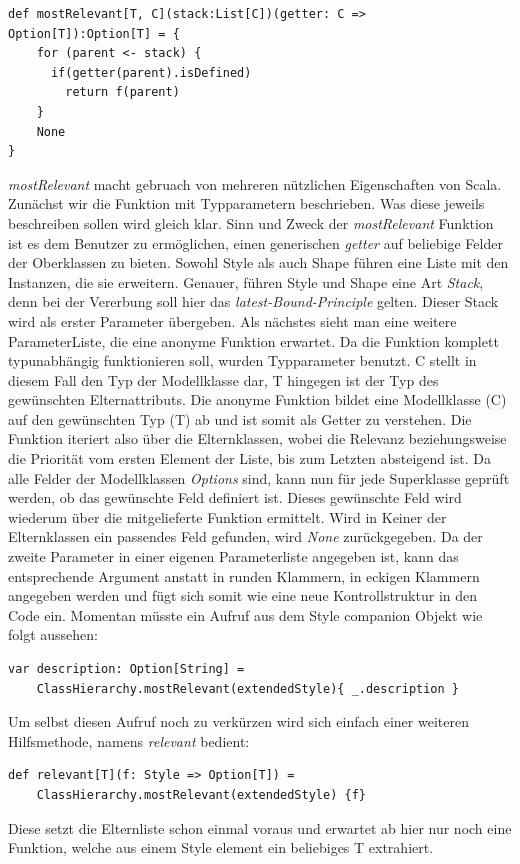 \begin{lstlisting}[style=scala]
def mostRelevant[T, C](stack:List[C])(getter: C => Option[T]):Option[T] = {
    for (parent <- stack) {
      if(getter(parent).isDefined)
        return f(parent)
    }
    None
}
\end{lstlisting}\textit{mostRelevant} macht gebruach von mehreren nützlichen Eigenschaften von Scala. Zunächst wir die Funktion mit Typparametern beschrieben. Was diese jeweils beschreiben sollen wird gleich klar. Sinn und Zweck der \textit{mostRelevant} Funktion ist es dem Benutzer zu ermöglichen, einen generischen \textit{getter} auf beliebige Felder der Oberklassen zu bieten. Sowohl Style als auch Shape führen eine Liste mit den Instanzen, die sie erweitern.
Genauer, führen Style und Shape eine Art \textit{Stack}, denn bei der Vererbung soll hier das \textit{latest-Bound-Principle} gelten. Dieser Stack wird als erster Parameter übergeben.
Als nächstes sieht man eine weitere ParameterListe, die eine anonyme Funktion erwartet. Da die Funktion komplett typunabhängig funktionieren soll, wurden Typparameter benutzt. C stellt in diesem Fall den Typ der Modellklasse dar, T hingegen ist der Typ des gewünschten Elternattributs. Die anonyme Funktion bildet eine Modellklasse (C) auf den gewünschten Typ (T) ab und ist somit als Getter zu verstehen. 
Die Funktion iteriert also über die Elternklassen, wobei die Relevanz beziehungsweise die Priorität vom ersten Element der Liste, bis zum Letzten absteigend ist.
Da alle Felder der Modellklassen \textit{Options} sind, kann nun für jede Superklasse geprüft werden, ob das gewünschte Feld definiert ist. Dieses gewünschte Feld wird wiederum über die mitgelieferte Funktion ermittelt. Wird in Keiner der Elternklassen ein passendes Feld gefunden, wird \textit{None} zurückgegeben. 
Da der zweite Parameter in einer eigenen Parameterliste angegeben ist, kann das entsprechende Argument anstatt in runden Klammern, in eckigen Klammern angegeben werden und fügt sich somit wie eine neue Kontrollstruktur in den Code ein.
Momentan müsste ein Aufruf aus dem Style companion Objekt wie folgt aussehen:
\begin{lstlisting}[style=scala]
var description: Option[String] = 
    ClassHierarchy.mostRelevant(extendedStyle){ _.description }
\end{lstlisting}Um selbst diesen Aufruf noch zu verkürzen wird sich einfach einer weiteren Hilfsmethode, namens \textit{relevant} bedient:
\begin{lstlisting}[style=scala]
def relevant[T](f: Style => Option[T]) =
    ClassHierarchy.mostRelevant(extendedStyle) {f}
\end{lstlisting}Diese setzt die Elternliste schon einmal voraus und erwartet ab hier nur noch eine Funktion, welche aus einem Style element ein beliebiges T extrahiert.
